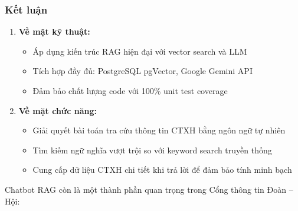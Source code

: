 \subsubsection{Kết luận}
\begin{enumerate}
    \item \textbf{Về mặt kỹ thuật:}
    
        \begin{itemize}
            \item Áp dụng kiến trúc RAG hiện đại với vector search và LLM
            \item Tích hợp đầy đủ: PostgreSQL pgVector, Google Gemini API
            \item Đảm bảo chất lượng code với 100\% unit test coverage
        \end{itemize}
        
    \item \textbf{Về mặt chức năng:}
    
        \begin{itemize}
            \item Giải quyết bài toán tra cứu thông tin CTXH bằng ngôn ngữ tự nhiên
            \item Tìm kiếm ngữ nghĩa vượt trội so với keyword search truyền thống
            \item Cung cấp dữ liệu CTXH chi tiết khi trả lời để đảm bảo tính minh bạch
        \end{itemize}
        
\end{enumerate}

Chatbot RAG còn là một thành phần quan trọng trong Cổng thông tin Đoàn -- Hội:

